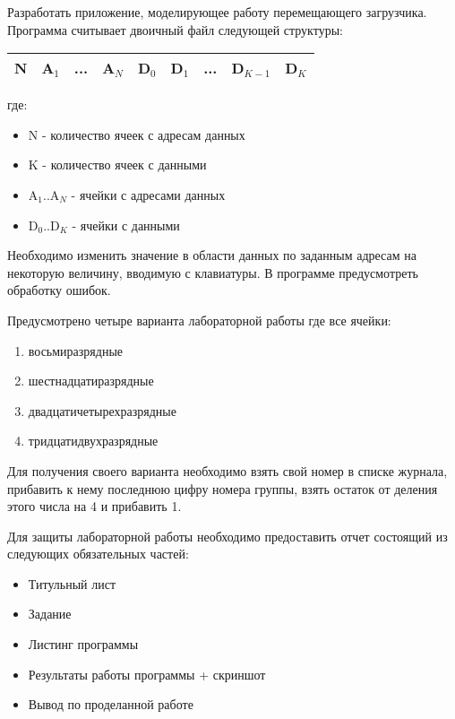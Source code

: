 \documentclass[a4paper,12pt]{article}
\begin{document}

    \begin{flushleft}
        Разработать приложение, моделирующее работу перемещающего загрузчика. Программа считывает двоичный файл следующей структуры:

        \begin{center}
            \begin{tabular}{|c|c|c|c|c|c|c|c|c|}
                \hline
                N & A$_{1}$ & ... & A$_{N}$ & D$_{0}$ & D$_{1}$ & ... & D$_{K-1}$ & D$_{K}$ \\
                \hline
            \end{tabular}
        \end{center}
    
        где:
        \begin{itemize}
            \item N - количество ячеек с адресам данных
            \item K - количество ячеек с данными
            \item A$_{1}$..A$_{N}$ - ячейки с адресами данных
            \item D$_{0}$..D$_{K}$ - ячейки с данными
        \end{itemize}
    
        Необходимо изменить значение в области данных по заданным адресам на некоторую величину, вводимую с клавиатуры. В программе предусмотреть обработку ошибок. \linebreak
    
        Предусмотрено четыре варианта лабораторной работы где все ячейки:
        \begin{enumerate}
            \item восьмиразрядные
            \item шестнадцатиразрядные
            \item двадцатичетырехразрядные
            \item тридцатидвухразрядные
        \end{enumerate}
    
        Для получения своего варианта необходимо взять свой номер в списке журнала, прибавить к нему последнюю цифру номера группы, взять остаток от деления этого числа на 4 и прибавить 1. \linebreak
    
        Для защиты лабораторной работы необходимо предоставить отчет состоящий из следующих обязательных частей:
        \begin{itemize}
            \item Титульный лист
            \item Задание
            \item Листинг программы
            \item Результаты работы программы + скриншот
            \item Вывод по проделанной работе
        \end{itemize}
    

\end{flushleft}
\end{document}
